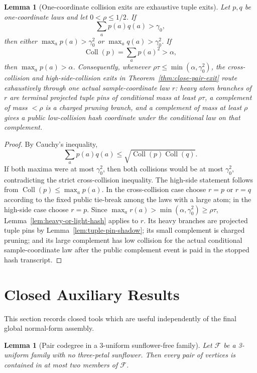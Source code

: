 \documentclass[11pt]{article}
\newtheorem{lemma}[theorem]{Lemma}
\newcommand{\F}{\mathcal F}
\newcommand{\Coll}{\operatorname{Coll}}
\begin{document}
\begin{lemma}[One-coordinate collision exits are exhaustive tuple exits]
\label{lem:collision-exit-pin}
Let $p,q$ be one-coordinate laws and let $0<\rho\le1/2$.  If
\[
  \sum_a p(a)q(a)>\gamma_0,
\]
then either $\max_a p(a)>\gamma_0^2$ or $\max_a q(a)>\gamma_0^2$.  If
\[
  \Coll(p)=\sum_a p(a)^2>\alpha,
\]
then $\max_a p(a)>\alpha$.  Consequently, whenever
$\rho\tau\le\min(\alpha,\gamma_0^2)$, the cross-collision and
high-side-collision exits in Theorem~\ref{thm:close-pair-exit} route
exhaustively through one actual sample-coordinate law $r$: heavy atom branches
of $r$ are terminal projected tuple pins of conditional mass at least
$\rho\tau$, a complement of mass $<\rho$ is a charged pruning branch, and a
complement of mass at least $\rho$ gives a public low-collision hash coordinate
under the conditional law on that complement.
\end{lemma}

\begin{proof}
By Cauchy's inequality,
\[
  \sum_a p(a)q(a)\le \sqrt{\Coll(p)\Coll(q)}.
\]
If both maxima were at most $\gamma_0^2$, then both collisions would be at
most $\gamma_0^2$, contradicting the strict cross-collision inequality.  The
high-side statement follows from $\Coll(p)\le\max_a p(a)$.  In the
cross-collision case choose $r=p$ or $r=q$ according to the fixed public
tie-break among the laws with a large atom; in the high-side case choose
$r=p$.  Since
$\max_a r(a)>\min(\alpha,\gamma_0^2)\ge\rho\tau$,
Lemma~\ref{lem:heavy-or-light-hash} applies to $r$.  Its heavy branches are
projected tuple pins by Lemma~\ref{lem:tuple-pin-shadow}; its small complement
is charged pruning; and its large complement has low collision for the actual
conditional sample-coordinate law after the public complement event is paid in
the stopped hash transcript.
\end{proof}

\section{Closed Auxiliary Results}
\label{sec:closed-auxiliary}

This section records closed tools which are useful independently of the final
global normal-form assembly.

\begin{lemma}[Pair codegree in a 3-uniform sunflower-free family]
\label{lem:pair-codegree}
Let $\F$ be a 3-uniform family with no three-petal sunflower.  Then every
pair of vertices is contained in at most two members of $\F$.
\end{lemma}
\end{document}
